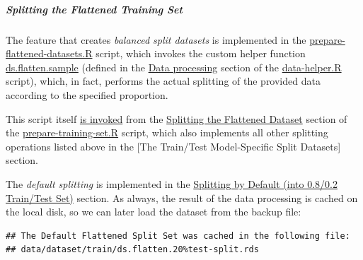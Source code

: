 \documentclass[
]{report}
\begin{document}
\subparagraph{Splitting the Flattened Training Set}\label{splitting-the-flattened-training-set}

\hfill\break

The feature that creates \emph{balanced split datasets} is implemented in the \href{https://github.com/AzKurban-edX-DS/edx.capstone.choose-your-own/blob/main/r/support-scripts/prepare-flattened-datasets.R}{prepare-flattened-datasets.R} script, which invokes the custom helper function \href{https://github.com/AzKurban-edX-DS/edx.capstone.choose-your-own/blob/main/r/support-functions/data-helper.R\#L908}{ds.flatten.sample} (defined in the \href{https://github.com/AzKurban-edX-DS/edx.capstone.choose-your-own/blob/main/r/support-functions/data-helper.R\#L519-L1080}{Data processing} section of the \href{https://github.com/AzKurban-edX-DS/edx.capstone.choose-your-own/blob/main/r/support-functions/data-helper.R\#L908}{data-helper.R} script), which, in fact, performs the actual splitting of the provided data according to the specified proportion.

\begin{noteblock}
This script itself \href{https://github.com/AzKurban-edX-DS/edx.capstone.choose-your-own/blob/main/r/support-scripts/prepare-training-set.R\#L61}{is invoked} from the \href{https://github.com/AzKurban-edX-DS/edx.capstone.choose-your-own/blob/main/r/support-scripts/prepare-training-set.R\#L53-L70}{Splitting the Flattened Dataset} section of the \href{https://github.com/AzKurban-edX-DS/edx.capstone.choose-your-own/blob/main/r/support-scripts/prepare-training-set.R\#L61}{prepare-training-set.R} script, which also implements all other splitting operations listed above in the {[}The Train/Test Model-Specific Split Datasets{]} section.

\end{noteblock}

\protect{}\label{ds_flatten.default_splitting}
The \emph{default splitting} is implemented in the \href{https://github.com/AzKurban-edX-DS/edx.capstone.choose-your-own/blob/main/r/support-scripts/prepare-flattened-datasets.R\#L23-L51}{Splitting by Default (into 0.8/0.2 Train/Test Set)} section.
As always, the result of the data processing is cached on the local disk, so we can later load the dataset from the backup file:

\begin{verbatim}
## The Default Flattened Split Set was cached in the following file:
## data/dataset/train/ds.flatten.20%test-split.rds
\end{verbatim}
\end{document}
